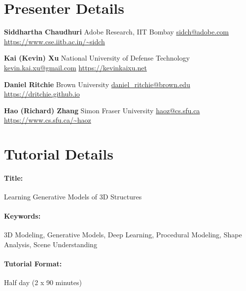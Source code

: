 \documentclass{egpubl}
\begin{document}
\section{Presenter Details}

\textbf{Siddhartha Chaudhuri}
\newline
Adobe Research, IIT Bombay
\newline
\url{sidch@adobe.com}
\newline
\url{https://www.cse.iitb.ac.in/~sidch}

\noindent
\textbf{Kai (Kevin) Xu}
\newline
National University of Defense Technology
\newline
\url{kevin.kai.xu@gmail.com}
\newline
\url{https://kevinkaixu.net}

\noindent
\textbf{Daniel Ritchie}
\newline
Brown University
\newline
\url{daniel_ritchie@brown.edu}
\newline
\url{https://dritchie.github.io}

\noindent
\textbf{Hao (Richard) Zhang }
\newline
Simon Fraser University
\newline
\url{haoz@cs.sfu.ca}
\newline
\url{https://www.cs.sfu.ca/~haoz}

\section{Tutorial Details}

\paragraph*{Title:}
Learning Generative Models of 3D Structures

\paragraph*{Keywords:}
3D Modeling, Generative Models, Deep Learning, Procedural Modeling, Shape Analysis, Scene Understanding

\paragraph*{Tutorial Format:}
Half day (2 x 90 minutes)
\end{document}
